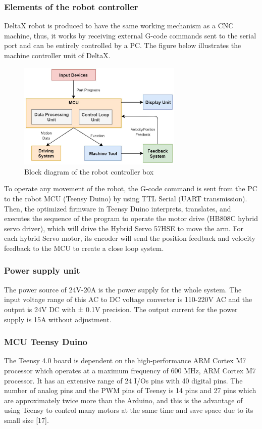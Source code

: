 \documentclass[10pt, letterpaper]{article}
\begin{document}
\subsubsection*{Elements of the robot controller}
    DeltaX robot is produced to have the same working mechanism as a CNC machine, thus, it works by receiving external G-code commands sent to the serial port and can be entirely controlled by a PC. The figure below illustrates the machine controller unit of DeltaX.\par
    \begin{figure}[h]
        \centering
        \includegraphics[width=0.7\textwidth]{fig10.JPG}
        \caption{Block diagram of the robot controller box}
    \end{figure}
    To operate any movement of the robot, the G-code command is sent from the PC to the robot MCU (Teensy Duino) by using TTL Serial (UART transmission). Then, the optimized firmware in Teensy Duino interprets, translates, and executes the sequence of the program to operate the motor drive (HB808C hybrid servo driver), which will drive the Hybrid Servo 57HSE to move the arm. For each hybrid Servo motor, its encoder will send the position feedback and velocity feedback to the MCU to create a close loop system.\par

\subsubsection*{Power supply unit}
    The power source of 24V-20A is the power supply for the whole system. The input voltage range of this AC to DC voltage converter is 110-220V AC and the output is 24V DC with ± 0.1V precision. The output current for the power supply is 15A without adjustment.\par

\subsubsection*{MCU Teensy Duino}
    The Teensy 4.0 board is dependent on the high-performance ARM Cortex M7 processor which operates at a maximum frequency of 600 MHz, ARM Cortex M7 processor. It has an extensive range of 24 I/Os pins with 40 digital pins. The number of analog pins and the PWM pins of Teensy is 14 pins and 27 pins which are approximately twice more than the Arduino, and this is the advantage of using Teensy to control many motors at the same time and save space due to its small size [17].\par
\end{document}
